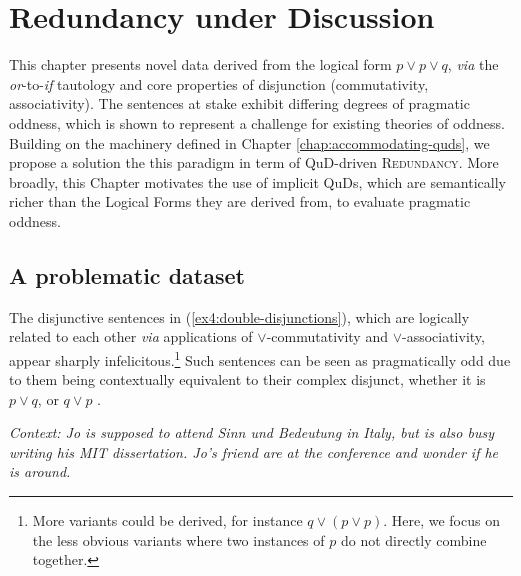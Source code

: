 
\chapter[Redundancy under Discussion]{Redundancy under Discussion\footnotemark}\label{chap:redundancy}

This chapter presents novel data derived from the logical form $p\vee p \vee q$, \textit{via} the \textit{or}-to-\textit{if} tautology and core properties of disjunction (commutativity, associativity). The sentences at stake exhibit differing degrees of pragmatic oddness, which is shown to represent a challenge for existing theories of oddness. Building on the machinery defined in Chapter \ref{chap:accommodating-quds}, we propose a solution the this paradigm in term of QuD-driven \textsc{Redundancy}. More broadly, this Chapter motivates the use of implicit QuDs, which are semantically richer than the Logical Forms they are derived from, to evaluate pragmatic oddness.


\section{A problematic dataset}

The disjunctive sentences in (\ref{ex4:double-disjunctions}), which are logically related to each other \textit{via} applications of $\vee$-commutativity and $\vee$-associativity, appear sharply infelicitous.\footnote{More variants could be derived, for instance $q\vee(p\vee p)$. Here, we focus on the less obvious variants where two instances of $p$ do not directly combine together.} Such sentences can be seen as pragmatically odd due to them being contextually equivalent to their complex disjunct, whether it is $p\vee q$, or $q \vee p$ \citep{Katzir2014}.

\begin{exe}
	\ex \textit{Context: Jo is supposed to attend Sinn und Bedeutung in Italy, but is also busy writing his MIT dissertation. Jo's friend are at the conference and wonder if he is around.}\label{ex4:double-disjunctions}
	\begin{xlist}
		\label{ex4:pv(pvq)}
		\label{ex4:pv(qvp)}
		\label{ex4:(pvq)vp}
		\label{ex4:(qvp)vp}
	\end{xlist}
\end{exe} 

